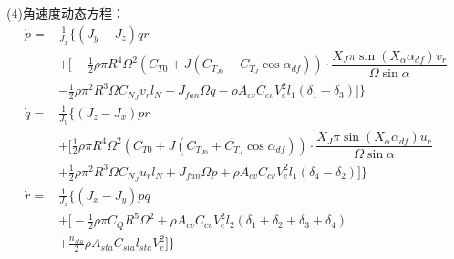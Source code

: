 (4)角速度动态方程：
\begin{equation}
    \label{eq:w_dynamic}
    \begin{aligned}
        \dot{p} = & \frac{1}{J_x} \biggl\{ (J_y - J_z)qr \\[4pt]
        &+ \biggl[ - \frac{1}{2}\rho \pi R^4 \Omega^2 (C_{T0} + J (C_{T_{J0}} + C_{T_J} \cos\alpha_{df})) \cdot \dfrac{X_J \pi \sin(X_\alpha \alpha_{df}) v_r}{\Omega \sin\alpha} \\[4pt]
        & - \frac{1}{2}\rho \pi^2 R^3 \Omega C_{N_J} v_r l_N - J_{{fan}} \Omega q - \rho A_{cv} C_{cv} V_e^2 l_1 (\delta_1 - \delta_3) \biggr] \biggr\} \\[4pt]
        \dot{q} = & \frac{1}{J_y} \biggl\{(J_z - J_x)pr \\[4pt]
        &+ \biggl[  \frac{1}{2}\rho \pi R^4 \Omega^2 (C_{T0} + J (C_{T_{J0}} + C_{T_J} \cos\alpha_{df})) \cdot \dfrac{X_J \pi \sin(X_\alpha \alpha_{df}) u_r}{\Omega \sin\alpha} \\[4pt]
        & + \frac{1}{2}\rho \pi^2 R^3 \Omega C_{N_J} u_r l_N + J_{{fan}} \Omega p + \rho A_{cv} C_{cv} V_e^2 l_1 (\delta_4 - \delta_2) \biggr] \biggr\} \\[4pt]
        \dot{r} = & \frac{1}{J_z} \biggl\{ (J_x - J_y)pq \\[4pt]
        &+\biggl[ - \frac{1}{2}\rho \pi C_Q R^5 \Omega^2  + \rho A_{cv} C_{cv} V_e^2 l_2 (\delta_1 + \delta_2 + \delta_3 + \delta_4) \\[4pt]
        & + \frac{n_{sta}}{2} \rho A_{sta} C_{sta} l_{sta} V_e^2 \biggr] \biggr\}
    \end{aligned}
\end{equation}


